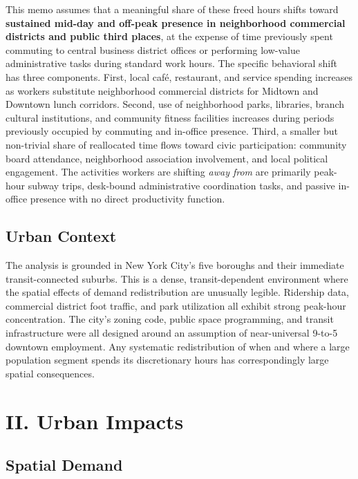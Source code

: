 \documentclass[10pt, twocolumn]{article}
\begin{document}
This memo assumes that a meaningful share of these freed hours shifts toward \textbf{sustained mid-day and off-peak presence in neighborhood commercial districts and public third places}, at the expense of time previously spent commuting to central business district offices or performing low-value administrative tasks during standard work hours. The specific behavioral shift has three components. First, local café, restaurant, and service spending increases as workers substitute neighborhood commercial districts for Midtown and Downtown lunch corridors. Second, use of neighborhood parks, libraries, branch cultural institutions, and community fitness facilities increases during periods previously occupied by commuting and in-office presence. Third, a smaller but non-trivial share of reallocated time flows toward civic participation: community board attendance, neighborhood association involvement, and local political engagement. The activities workers are shifting \textit{away from} are primarily peak-hour subway trips, desk-bound administrative coordination tasks, and passive in-office presence with no direct productivity function.

\subsection*{Urban Context}

The analysis is grounded in New York City's five boroughs and their immediate transit-connected suburbs. This is a dense, transit-dependent environment where the spatial effects of demand redistribution are unusually legible. Ridership data, commercial district foot traffic, and park utilization all exhibit strong peak-hour concentration. The city's zoning code, public space programming, and transit infrastructure were all designed around an assumption of near-universal 9-to-5 downtown employment. Any systematic redistribution of when and where a large population segment spends its discretionary hours has correspondingly large spatial consequences.

\section*{II. Urban Impacts}

\subsection*{Spatial Demand}
\end{document}
